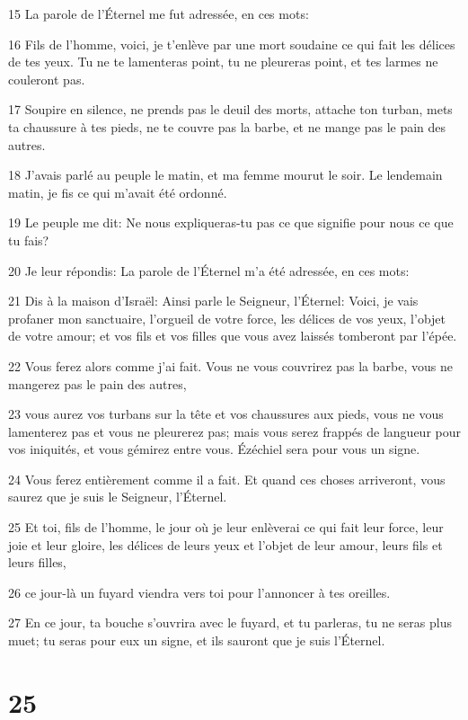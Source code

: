 \par 15 La parole de l'Éternel me fut adressée, en ces mots:
\par 16 Fils de l'homme, voici, je t'enlève par une mort soudaine ce qui fait les délices de tes yeux. Tu ne te lamenteras point, tu ne pleureras point, et tes larmes ne couleront pas.
\par 17 Soupire en silence, ne prends pas le deuil des morts, attache ton turban, mets ta chaussure à tes pieds, ne te couvre pas la barbe, et ne mange pas le pain des autres.
\par 18 J'avais parlé au peuple le matin, et ma femme mourut le soir. Le lendemain matin, je fis ce qui m'avait été ordonné.
\par 19 Le peuple me dit: Ne nous expliqueras-tu pas ce que signifie pour nous ce que tu fais?
\par 20 Je leur répondis: La parole de l'Éternel m'a été adressée, en ces mots:
\par 21 Dis à la maison d'Israël: Ainsi parle le Seigneur, l'Éternel: Voici, je vais profaner mon sanctuaire, l'orgueil de votre force, les délices de vos yeux, l'objet de votre amour; et vos fils et vos filles que vous avez laissés tomberont par l'épée.
\par 22 Vous ferez alors comme j'ai fait. Vous ne vous couvrirez pas la barbe, vous ne mangerez pas le pain des autres,
\par 23 vous aurez vos turbans sur la tête et vos chaussures aux pieds, vous ne vous lamenterez pas et vous ne pleurerez pas; mais vous serez frappés de langueur pour vos iniquités, et vous gémirez entre vous. Ézéchiel sera pour vous un signe.
\par 24 Vous ferez entièrement comme il a fait. Et quand ces choses arriveront, vous saurez que je suis le Seigneur, l'Éternel.
\par 25 Et toi, fils de l'homme, le jour où je leur enlèverai ce qui fait leur force, leur joie et leur gloire, les délices de leurs yeux et l'objet de leur amour, leurs fils et leurs filles,
\par 26 ce jour-là un fuyard viendra vers toi pour l'annoncer à tes oreilles.
\par 27 En ce jour, ta bouche s'ouvrira avec le fuyard, et tu parleras, tu ne seras plus muet; tu seras pour eux un signe, et ils sauront que je suis l'Éternel.

\chapter{25}


